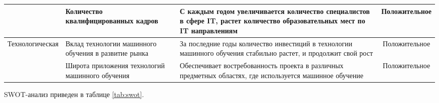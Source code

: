 \documentclass[../main]{subfiles}
\begin{document}
\begin{ltwrap}{2mm}{1}{\footnotesize}
\begin{longtable}[H]{|C{.2\x}|M{.3\x}|M{.3\x}|C{.2\x}|}
        & Количество квалифицированных кадров
        & С каждым годом увеличивается количество специалистов в сфере IT, растет количество образовательных мест по IT направлениям
        & Положительное\\\hline
        Технологическая
        & Вклад технологии машинного обучения в развитие рынка
        & За последние годы количество инвестиций в технологии машинного обучения стабильно растет, и продолжит свой рост
        & Положительное\\
        & Широта приложения технологий машинного обучения
        & Обеспечивает востребованность проекта в различных предметных областях, где используется машинное обучение
        & Положительное\\\hline
    \end{longtable}
\end{ltwrap}

SWOT-анализ приведен в таблице \ref{tab:swot}.
\end{document}
